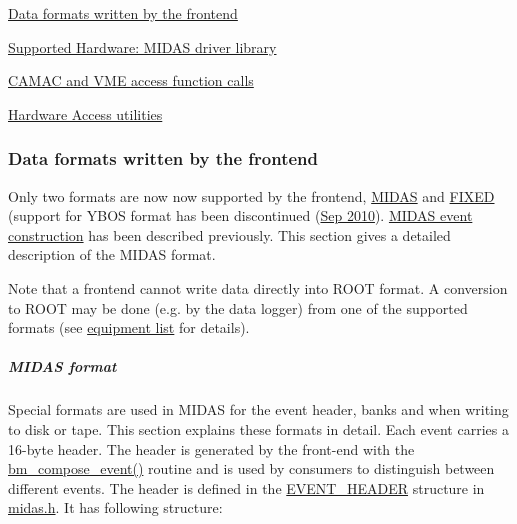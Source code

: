  \par
 \par


\par



\begin{DoxyItemize}
\item \hyperlink{FE_Data_format}{Data formats written by the frontend}
\item \hyperlink{FE_Hardware}{Supported Hardware: MIDAS driver library}
\item \hyperlink{FE_camac_vme_function_calls}{CAMAC and VME access function calls}
\item \hyperlink{FE_utils}{Hardware Access utilities} \label{index_end}
\hypertarget{index_end}{}
 
\end{DoxyItemize}\subsubsection{Data formats written by the frontend}\label{FE_Data_format}
\par




\par
 \par
 \label{FE_Data_format_idx_format_frontend}
\hypertarget{FE_Data_format_idx_format_frontend}{}
 Only two formats are now now supported by the frontend, \hyperlink{FE_Data_format_FE_Midas_format}{MIDAS} and \hyperlink{FE_bank_construction_FE_FIXED_event_readout}{FIXED} (support for YBOS format has been discontinued (\hyperlink{NDF_ndf_sep_2010}{Sep 2010}). \hyperlink{FE_bank_construction_FE_MIDAS_event_construction}{MIDAS event construction} has been described previously. This section gives a detailed description of the MIDAS format.

Note that a frontend cannot write data directly into ROOT format. A conversion to ROOT may be done (e.g. by the data logger) from one of the supported formats (see \hyperlink{FE_table_FE_tbl_Format}{equipment list} for details).

\label{FE_Data_format_idx_format_MIDAS}
\hypertarget{FE_Data_format_idx_format_MIDAS}{}
 \label{FE_Data_format_idx_Midas_format}
\hypertarget{FE_Data_format_idx_Midas_format}{}
 \label{FE_Data_format_Midas_format}
\hypertarget{FE_Data_format_Midas_format}{}
 

 \hypertarget{FE_Data_format_FE_Midas_format}{}\subparagraph{MIDAS format}\label{FE_Data_format_FE_Midas_format}
Special formats are used in MIDAS for the event header, banks and when writing to disk or tape. This section explains these formats in detail. Each event carries a 16-\/byte header. The header is generated by the front-\/end with the \hyperlink{group__bmfunctionc_gac5e3e469fb6721a502ebd80a35a328f5}{bm\_\-compose\_\-event()} routine and is used by consumers to distinguish between different events. The header is defined in the \hyperlink{structEVENT__HEADER}{EVENT\_\-HEADER} structure in \hyperlink{midas_8h}{midas.h}. It has following structure:

